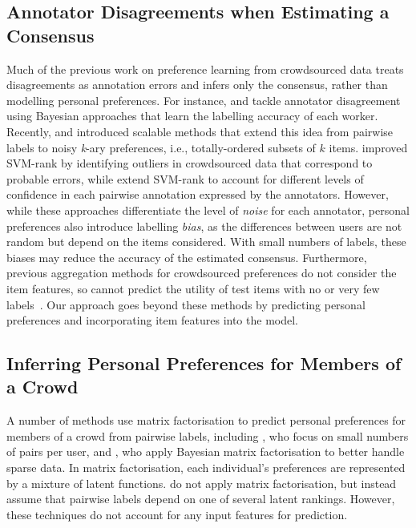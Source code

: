 \subsection{Annotator Disagreements when Estimating a Consensus}

Much of the previous work on preference learning from crowdsourced data 
treats disagreements as annotation errors and infers only the consensus,
rather than modelling personal preferences.
For instance, 
\citet{chen2013pairwise} and \citet{wang2016blind} 
tackle annotator disagreement %
using Bayesian approaches that learn the labelling accuracy of each worker.
Recently, \citet{pan2018stagewise} and \citet{han2018robust} 
introduced scalable methods that extend this idea from pairwise labels
to noisy \textit{k}-ary preferences,
i.e., totally-ordered subsets of $k$ items.
\citet{fu2016robust} improved SVM-rank by identifying outliers in crowdsourced data
that correspond to probable errors,
while \citet{uchida2017entity} extend SVM-rank to account for different levels of confidence in each pairwise annotation expressed by the annotators.
However, while these approaches differentiate the level of \emph{noise}
for each annotator,
personal preferences also introduce labelling \emph{bias}, 
as the differences between users are not random but depend on the items considered.
With small numbers of labels, these biases may reduce the accuracy of the estimated
consensus.
Furthermore, previous aggregation methods for crowdsourced preferences
do not consider the item features,
so cannot predict the utility of test items with no or very few labels~\citep{chen2013pairwise,wang2016blind,han2018robust,pan2018stagewise,li2018hybrid}.
Our approach goes beyond these methods
by predicting personal preferences
and incorporating item features into the model.

\subsection{Inferring Personal Preferences for Members of a Crowd}

A number of methods use matrix factorisation to predict personal preferences 
for members of a crowd from pairwise labels,
including 
\citet{yi_inferring_2013}, who focus on small numbers of pairs per user,
and \citet{salimans2012collaborative}, who apply Bayesian matrix factorisation to 
better handle sparse data.
In matrix factorisation, each individual's preferences are represented 
by a mixture of latent functions.
\citet{kim2014latent} do not apply matrix factorisation, but instead
assume that pairwise labels depend on one of several latent rankings.
However, these techniques do not account for any input features for prediction.

